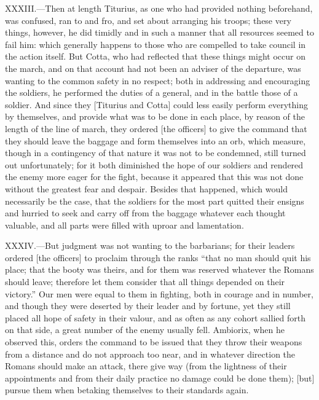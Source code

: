XXXIII.—Then at length Titurius, as one who had provided nothing
beforehand, was confused, ran to and fro, and set about arranging his
troops; these very things, however, he did timidly and in such a manner
that all resources seemed to fail him: which generally happens to those
who are compelled to take council in the action itself. But Cotta, who
had reflected that these things might occur on the march, and on that
account had not been an adviser of the departure, was wanting to the
common safety in no respect; both in addressing and encouraging the
soldiers, he performed the duties of a general, and in the battle those
of a soldier. And since they [Titurius and Cotta] could less easily
perform everything by themselves, and provide what was to be done in
each place, by reason of the length of the line of march, they ordered
[the officers] to give the command that they should leave the baggage
and form themselves into an orb, which measure, though in a contingency
of that nature it was not to be condemned, still turned out
unfortunately; for it both diminished the hope of our soldiers and
rendered the enemy more eager for the fight, because it appeared that
this was not done without the greatest fear and despair. Besides that
happened, which would necessarily be the case, that the soldiers for the
most part quitted their ensigns and hurried to seek and carry off from
the baggage whatever each thought valuable, and all parts were filled
with uproar and lamentation.

XXXIV.—But judgment was not wanting to the barbarians; for their
leaders ordered [the officers] to proclaim through the ranks ``that no
man should quit his place; that the booty was theirs, and for them was
reserved whatever the Romans should leave; therefore let them consider
that all things depended on their victory.'' Our men were equal to them
in fighting, both in courage and in number, and though they were
deserted by their leader and by fortune, yet they still placed all hope
of safety in their valour, and as often as any cohort sallied forth on
that side, a great number of the enemy usually fell. Ambiorix, when he
observed this, orders the command to be issued that they throw their
weapons from a distance and do not approach too near, and in whatever
direction the Romans should make an attack, there give way (from the
lightness of their appointments and from their daily practice no damage
could be done them); [but] pursue them when betaking themselves to their
standards again.

